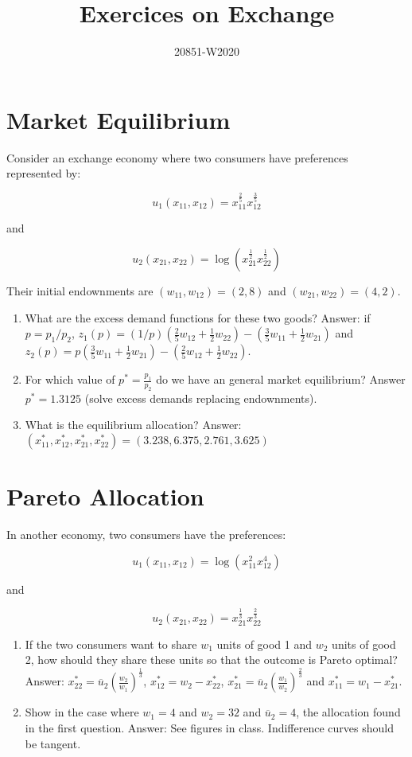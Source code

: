 \documentclass[11pt, oneside,french]{article}   	%
\title{Exercices on Exchange}
\author{20851-W2020}
\date{}							%
\begin{document}
\maketitle

\section*{Market Equilibrium}

Consider an exchange economy where two consumers have preferences represented by: 

$$ u_1(x_{11},x_{12}) = x_{11}^{\frac{2}{5}}x_{12}^{\frac{3}{5}} $$

and 

$$ u_2(x_{21},x_{22}) = \log \left(x_{21}^{\frac{1}{2}}x_{22}^{\frac{1}{2}} \right)$$

Their initial endownments are $(w_{11},w_{12}) = (2,8)$ and $(w_{21},w_{22}) = (4,2)$.
\begin{enumerate}
    \item What are the excess demand functions for these two goods?  Answer: if $p = p_1/p_2$, $z_1(p) = (1/p)\left( \frac{2}{5}w_{12} + \frac{1}{2}w_{22}\right) - \left( \frac{3}{5}w_{11} + \frac{1}{2}w_{21}\right)  $ and $z_2(p) = p\left( \frac{3}{5}w_{11} + \frac{1}{2}w_{21}\right) - \left( \frac{2}{5}w_{12} + \frac{1}{2}w_{22}\right)$. 
    \item For which value of $p^* = \frac{p_1}{p_2}$ do we have an general market equilibrium? Answer $p^* = 1.3125$ (solve excess demands replacing endownments). 
    \item What is the equilibrium allocation? Answer: $(x^*_{11},x^*_{12},x^*_{21},x^*_{22}) = (3.238,6.375,2.761,3.625)$
\end{enumerate}

\section*{Pareto Allocation}

In another economy, two consumers have the preferences: 


$$ u_1(x_{11},x_{12}) = \log \left(x_{11}^{2}x_{12}^{4} \right)$$

and 

$$ u_2(x_{21},x_{22}) = x_{21}^{\frac{1}{3}}x_{22}^{\frac{2}{3}} $$

\begin{enumerate}
    \item If the two consumers want to share $w_1$ units of good 1 and $w_2$ units of good 2, how should they share these units so that the outcome is Pareto optimal? Answer: $x^*_{22} = \overline{u}_2 \left( \frac{w_2}{w_1}\right)^{\frac{1}{3}}$, $x^*_{12} = w_2 - x^*_{22}$, $x^*_{21} = \overline{u}_2 \left( \frac{w_1}{w_2}\right)^{\frac{2}{3}}$ and $x^*_{11} = w_1 - x^*_{21}$.
    \item Show in the case where $w_1 = 4$ and $w_2 = 32$ and $\overline{u}_2=4$, the allocation found in the first question. Answer: See figures in class. Indifference curves should be tangent. 
    
\end{enumerate}
\end{document}
